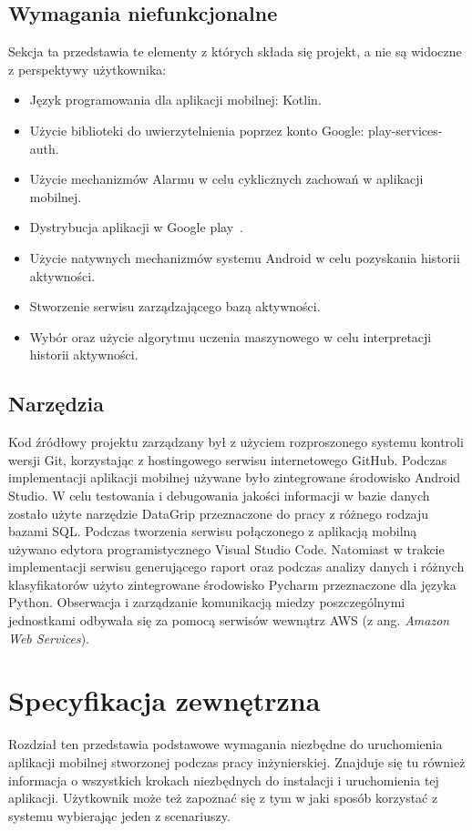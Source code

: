 \documentclass[a4paper,twoside,12pt]{book}
\newcommand{\obcy}[1]{\emph{#1}}
\newcommand{\ang}[1]{{\selectlanguage{british}\obcy{#1}}}
\begin{document}
\FloatBarrier

\section{Wymagania niefunkcjonalne}
Sekcja ta przedstawia te elementy z których składa się projekt, a nie są widoczne z perspektywy użytkownika:
\begin{itemize}
  \item Język programowania dla aplikacji mobilnej: Kotlin.
  \item Użycie biblioteki do uwierzytelnienia poprzez konto Google: play-services-auth.
  \item Użycie mechanizmów Alarmu w celu cyklicznych zachowań w aplikacji mobilnej.
  \item Dystrybucja aplikacji w Google play~\cite{publish_app}.
  \item Użycie natywnych mechanizmów systemu Android w celu pozyskania historii aktywności.
  \item Stworzenie serwisu zarządzającego bazą aktywności.
  \item Wybór oraz użycie algorytmu uczenia maszynowego w celu interpretacji historii aktywności.
\end{itemize}

\section{Narzędzia}
Kod źródłowy projektu zarządzany był z użyciem rozproszonego systemu kontroli wersji Git, korzystając z hostingowego serwisu internetowego GitHub. Podczas implementacji aplikacji mobilnej używane było zintegrowane środowisko Android Studio. W celu testowania i debugowania jakości informacji w bazie danych zostało użyte narzędzie DataGrip przeznaczone do pracy z różnego rodzaju bazami SQL. Podczas tworzenia serwisu połączonego z aplikacją mobilną używano edytora programistycznego Visual Studio Code. Natomiast w trakcie implementacji serwisu generującego raport oraz podczas analizy danych i różnych klasyfikatorów użyto zintegrowane środowisko Pycharm przeznaczone dla języka Python. Obserwacja i zarządzanie komunikacją miedzy poszczególnymi jednostkami odbywała się za pomocą serwisów wewnątrz AWS (z ang. \ang{Amazon Web Services}).


\chapter{Specyfikacja zewnętrzna}
\label{chap:zewn}
Rozdział ten przedstawia podstawowe wymagania niezbędne do uruchomienia aplikacji mobilnej stworzonej podczas pracy inżynierskiej. Znajduje się tu również informacja o wszystkich krokach niezbędnych do instalacji i uruchomienia tej aplikacji. Użytkownik może też zapoznać się z tym w jaki sposób korzystać z systemu wybierając jeden z scenariuszy. 
\end{document}

